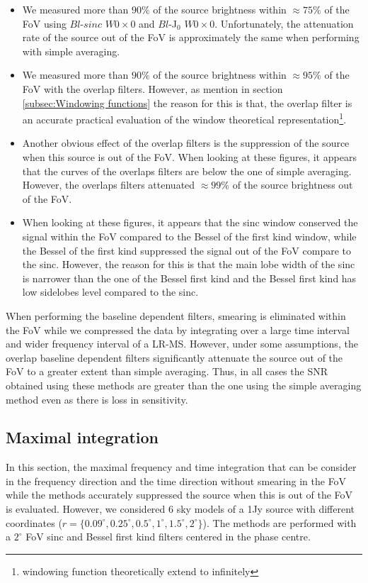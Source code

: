 \documentclass[useAMS,usenatbib]{mn2e}
\begin{document}
\begin{itemize}
 \item We measured more than $90\%$ of the source brightness within $\approx 75\%$ of the FoV using $Bl$-$sinc$ $W0 \times 0$ and 
      $Bl$-J$_0$ $W0\times0$. Unfortunately, the attenuation rate of the source out of the FoV is approximately the same when performing 
with simple averaging.
 \item We measured more than $90\%$ of the source brightness within $\approx 95\%$ of the FoV with the overlap filters. However, as mention 
in section \ref{subsec:Windowing functions} the reason for this is that, the overlap filter is an accurate practical evaluation of the 
window theoretical representation\footnote{windowing function theoretically extend to infinitely}. 
 \item Another obvious effect of the overlap filters is the suppression of the source when this source is out of the FoV. When
looking at these figures, it appears that the curves of the overlaps filters are below the one of simple averaging.  However, the overlaps 
filters attenuated $\approx 99\%$ of the source brightness out of the FoV.
  \item  When
looking at these figures, it appears that the sinc window conserved the signal within the FoV compared to the Bessel of the 
first kind window, while the Bessel of the first kind suppressed the signal out of the FoV compare to the sinc. However, the reason for 
this is that
the main lobe width of the sinc is narrower than the one of the Bessel first kind and the Bessel first kind has low 
sidelobes level compared to the sinc.
\end{itemize}
When performing the baseline dependent filters, smearing is eliminated within the FoV while we compressed 
the data by integrating over a large time interval and wider frequency interval of a LR-MS. However, under some assumptions,
the overlap baseline dependent filters significantly attenuate the source  out of the FoV  to a greater extent than simple averaging. Thus,
in all cases the SNR obtained using these methods are greater than the one using the simple averaging method even as there is loss in 
sensitivity.
\subsection{Maximal integration}
In this section, the maximal frequency and time integration that can be consider in the frequency direction and the time 
direction without smearing in the FoV while the methods accurately suppressed the source when this is out of the FoV is evaluated. However, 
we considered $6$ sky models of a 1Jy source with different coordinates ($r=\{0.09^\circ,0.25^\circ,0.5^\circ,1^\circ,1.5^\circ, 
2^\circ\}$). The methods are performed with a $2^\circ$ FoV sinc and Bessel first kind filters centered in the phase centre.
\end{document}
